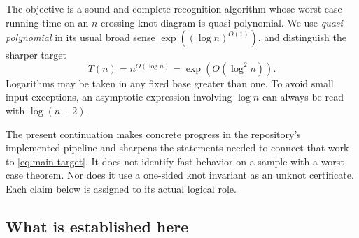 \documentclass[11pt,a4paper]{article}
\theoremstyle{definition}
\theoremstyle{remark}
\begin{document}
The objective is a sound and complete recognition algorithm whose worst-case
running time on an $n$-crossing knot diagram is quasi-polynomial.  We use
\emph{quasi-polynomial} in its usual broad sense
$\exp((\log n)^{O(1)})$, and distinguish the sharper target
\begin{equation}
 T(n)=n^{O(\log n)}=\exp(O(\log^2 n)).
 \label{eq:main-target}
\end{equation}
Logarithms may be taken in any fixed base greater than one.  To avoid small
input exceptions, an asymptotic expression involving $\log n$ can always be
read with $\log(n+2)$.

The present continuation makes concrete progress in the repository's
implemented pipeline and sharpens the statements needed to connect that work
to \eqref{eq:main-target}.  It does not identify fast behavior on a sample
with a worst-case theorem.  Nor does it use a one-sided knot invariant as an
unknot certificate.  Each claim below is assigned to its actual logical role.

\subsection{What is established here}
\end{document}
